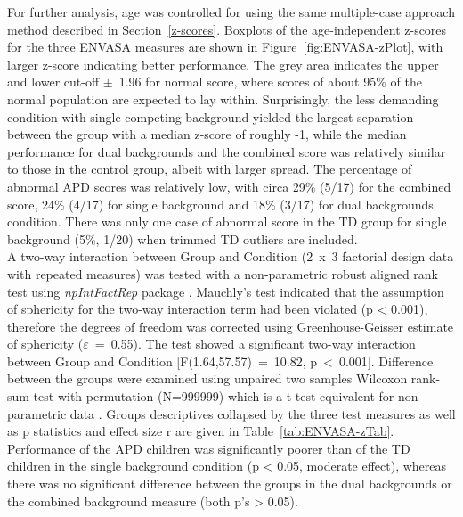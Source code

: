 \documentclass[a4paper, twoside]{templates/ociamthesis}
\begin{document}
For further analysis, age was controlled for using the same multiple-case approach method described in Section~\ref{z-scores}. Boxplots of the age-independent z-scores for the three ENVASA measures are shown in Figure~\ref{fig:ENVASA-zPlot}, with larger z-score indicating better performance. The grey area indicates the upper and lower cut-off \(\pm\)~1.96 for normal score, where scores of about 95\% of the normal population are expected to lay within. Surprisingly, the less demanding condition with single competing background yielded the largest separation between the group with a median z-score of roughly -1, while the median performance for dual backgrounds and the combined score was relatively similar to those in the control group, albeit with larger spread. The percentage of abnormal APD scores was relatively low, with circa 29\% (5/17) for the combined score, 24\% (4/17) for single background and 18\% (3/17) for dual backgrounds condition. There was only one case of abnormal score in the TD group for single background (5\%, 1/20) when trimmed TD outliers are included.\\

A two-way interaction between Group and Condition (2~x~3 factorial design data with repeated measures) was tested with a non-parametric robust aligned rank test using \emph{npIntFactRep} package \autocite{npIntFactRepPackageR}. Mauchly's test indicated that the assumption of sphericity for the two-way interaction term had been violated (p \textless{} 0.001), therefore the degrees of freedom was corrected using Greenhouse-Geisser estimate of sphericity (\(\varepsilon\)~=~0.55). The test showed a significant two-way interaction between Group and Condition {[}F(1.64,57.57)~=~10.82, p~\textless~0.001{]}. Difference between the groups were examined using unpaired two samples Wilcoxon rank-sum test with permutation (N=999999) which is a t-test equivalent for non-parametric data \autocite[\emph{coin::wilcox\_test()};][]{CoinPackageR}. Groups descriptives collapsed by the three test measures as well as p statistics and effect size r are given in Table~\ref{tab:ENVASA-zTab}. Performance of the APD children was significantly poorer than of the TD children in the single background condition (p \textless{} 0.05, moderate effect), whereas there was no significant difference between the groups in the dual backgrounds or the combined background measure (both p's \textgreater{} 0.05).\\
\end{document}
